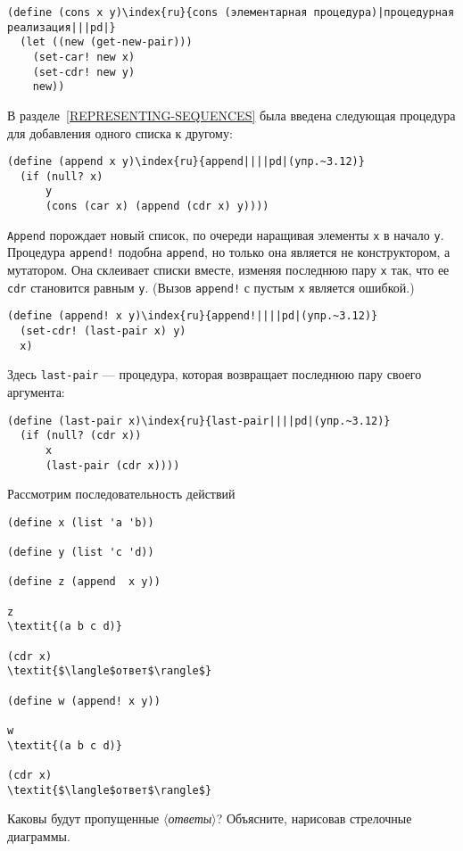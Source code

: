 \begin{Verbatim}[fontsize=\small]
(define (cons x y)\index{ru}{cons (элементарная процедура)|процедурная реализация|||pd|}
  (let ((new (get-new-pair)))
    (set-car! new x)
    (set-cdr! new y)
    new))
\end{Verbatim}
\begin{exercise}{3.12}\label{EX3.12}%
В разделе~\ref{REPRESENTING-SEQUENCES} была
введена следующая процедура для добавления одного списка к другому:

\begin{Verbatim}[fontsize=\small]
(define (append x y)\index{ru}{append||||pd|(упр.~3.12)}
  (if (null? x)
      y
      (cons (car x) (append (cdr x) y))))
\end{Verbatim}
{\tt Append} порождает новый список, по очереди наращивая
элементы {\tt x} в начало {\tt y}.  Процедура
{\tt append!} подобна {\tt append}, но только она
является не конструктором, а мутатором.  Она склеивает списки вместе,
изменяя последнюю пару {\tt x} так, что ее {\tt cdr}
становится равным {\tt y}. (Вызов {\tt append!} с пустым
{\tt x} является ошибкой.)

\begin{Verbatim}[fontsize=\small]
(define (append! x y)\index{ru}{append!||||pd|(упр.~3.12)}
  (set-cdr! (last-pair x) y)
  x)
\end{Verbatim}
Здесь {\tt last-pair} --- процедура, которая возвращает
последнюю пару своего аргумента:

\begin{Verbatim}[fontsize=\small]
(define (last-pair x)\index{ru}{last-pair||||pd|(упр.~3.12)}
  (if (null? (cdr x))
      x
      (last-pair (cdr x))))
\end{Verbatim}
Рассмотрим последовательность действий

\begin{Verbatim}[fontsize=\small]
(define x (list 'a 'b))

(define y (list 'c 'd))

(define z (append  x y))

z
\textit{(a b c d)}

(cdr x)
\textit{$\langle$ответ$\rangle$}

(define w (append! x y))

w
\textit{(a b c d)}

(cdr x)
\textit{$\langle$ответ$\rangle$}
\end{Verbatim}
Каковы будут пропущенные \textit{$\langle$ответы$\rangle$}?
Объясните, нарисовав стрелочные диаграммы.
\end{exercise}
